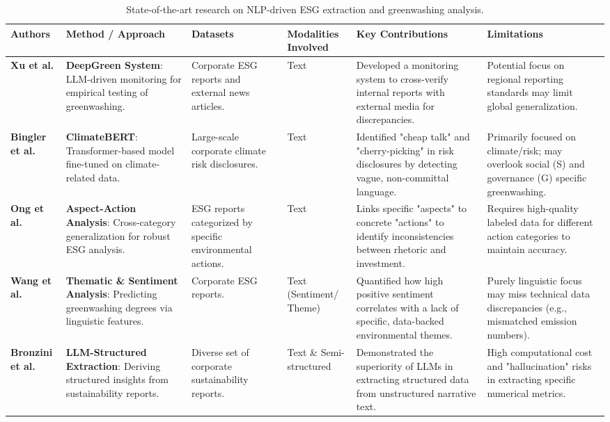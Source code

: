 \begin{landscape}
\begin{table}[p]
\centering
\caption{State-of-the-art research on NLP-driven ESG extraction and greenwashing analysis.}
\label{tab:relatedwork-esg-greenwashing-overview-a}
\small
\renewcommand{\arraystretch}{1.2}
\begin{tabularx}{\linewidth}{|p{1.8cm}|X|X|p{1.8cm}|X|X|}
\hline
Authors & Method / Approach & Datasets & Modalities Involved & Key Contributions & Limitations \\ \hline
\textbf{Xu et al.}  \parencite{chong_xu_bff21576} & \textbf{DeepGreen System}: LLM-driven monitoring for empirical testing of greenwashing. & Corporate ESG reports and external news articles. & Text & Developed a monitoring system to cross-verify internal reports with external media for discrepancies. & Potential focus on regional reporting standards may limit global generalization. \\ \hline
\textbf{Bingler et al.}  \parencite{julia_bingler_268445e3} & \textbf{ClimateBERT}: Transformer-based model fine-tuned on climate-related data. & Large-scale corporate climate risk disclosures. & Text & Identified "cheap talk" and "cherry-picking" in risk disclosures by detecting vague, non-committal language. & Primarily focused on climate/risk; may overlook social (S) and governance (G) specific greenwashing. \\ \hline
\textbf{Ong et al.}  \parencite{keane_ong_369a0b63} & \textbf{Aspect-Action Analysis}: Cross-category generalization for robust ESG analysis. & ESG reports categorized by specific environmental actions. & Text & Links specific "aspects" to concrete "actions" to identify inconsistencies between rhetoric and investment. & Requires high-quality labeled data for different action categories to maintain accuracy. \\ \hline
\textbf{Wang et al.}  \parencite{xiaojia_wang_02351a60} & \textbf{Thematic \& Sentiment Analysis}: Predicting greenwashing degrees via linguistic features. & Corporate ESG reports. & Text (Sentiment/ Theme) & Quantified how high positive sentiment correlates with a lack of specific, data-backed environmental themes. & Purely linguistic focus may miss technical data discrepancies (e.g., mismatched emission numbers). \\ \hline
\textbf{Bronzini et al.}  \parencite{marco_bronzini_bf94d949} & \textbf{LLM-Structured Extraction}: Deriving structured insights from sustainability reports. & Diverse set of corporate sustainability reports. & Text \& Semi-structured & Demonstrated the superiority of LLMs in extracting structured data from unstructured narrative text. & High computational cost and "hallucination" risks in extracting specific numerical metrics. \\ \hline

\end{tabularx}
\end{table}
\end{landscape}
